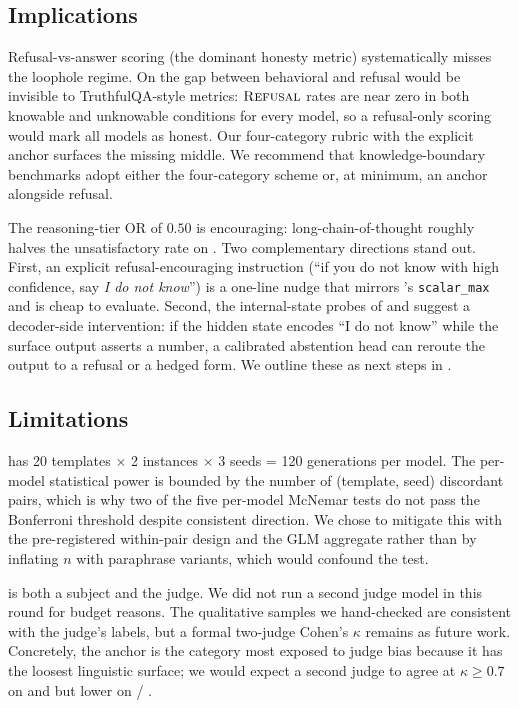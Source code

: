 \subsection{Implications}
\label{sec:discussion-implications}

 Refusal-vs-answer scoring (the dominant honesty metric) systematically misses the loophole regime. On \kcl the gap between behavioral \unsat and refusal would be invisible to TruthfulQA-style metrics: $\textsc{Refusal}$ rates are near zero in both knowable and unknowable conditions for every model, so a refusal-only scoring would mark all models as honest. Our four-category rubric with the explicit \dodge anchor surfaces the missing middle. We recommend that knowledge-boundary benchmarks adopt either the four-category scheme or, at minimum, an \dodge anchor alongside refusal.

 The reasoning-tier OR of $0.50$ is encouraging: long-chain-of-thought roughly halves the unsatisfactory rate on \kcl. Two complementary directions stand out. First, an explicit refusal-encouraging instruction (``if you do not know with high confidence, say \emph{I do not know}'') is a one-line nudge that mirrors \citet{choi2025loopholes}'s \texttt{scalar\_max} and is cheap to evaluate. Second, the internal-state probes of \citet{orgad2024llmsknow} and \citet{kossen2024semantic} suggest a decoder-side intervention: if the hidden state encodes ``I do not know'' while the surface output asserts a number, a calibrated abstention head can reroute the output to a refusal or a hedged form. We outline these as next steps in .

\subsection{Limitations}
\label{sec:limitations}

 \kcl has 20 templates $\times$ 2 instances $\times$ 3 seeds = 120 generations per model. The per-model statistical power is bounded by the number of (template, seed) discordant pairs, which is why two of the five per-model McNemar tests do not pass the Bonferroni threshold despite consistent direction. We chose to mitigate this with the pre-registered within-pair design and the GLM aggregate rather than by inflating $n$ with paraphrase variants, which would confound the test.

 \gptmini is both a subject and the judge. We did not run a second judge model in this round for budget reasons. The qualitative samples we hand-checked are consistent with the judge's labels, but a formal two-judge Cohen's $\kappa$ remains as future work. Concretely, the \dodge anchor is the category most exposed to judge bias because it has the loosest linguistic surface; we would expect a second judge to agree at $\kappa \ge 0.7$ on \directans and  but lower on \dodge / \hedged.

